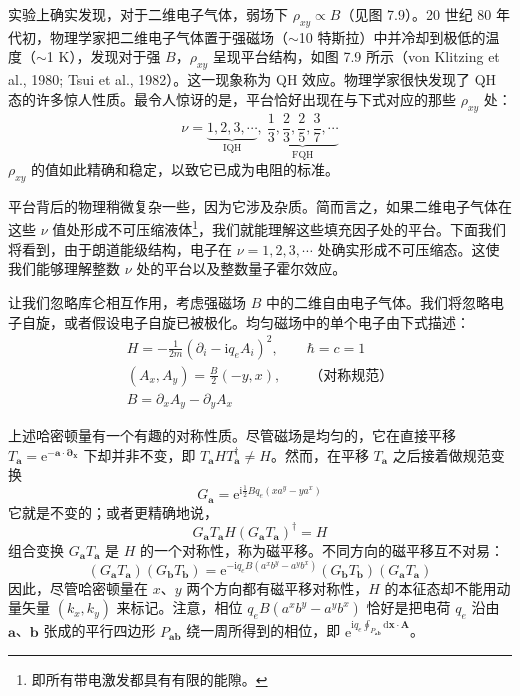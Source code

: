 实验上确实发现，对于二维电子气体，弱场下 $\rho_{xy}\propto B$（见图 7.9）。20 世纪 80 年代初，物理学家把二维电子气体置于强磁场（$\sim$10 特斯拉）中并冷却到极低的温度（$\sim$1 K），发现对于强 $B$，$\rho_{xy}$ 呈现平台结构，如图 7.9 所示（von Klitzing et al., 1980; Tsui et al., 1982）。这一现象称为 QH 效应。物理学家很快发现了 QH 态的许多惊人性质。最令人惊讶的是，平台恰好出现在与下式对应的那些 $\rho_{xy}$ 处：
\begin{equation*}
\nu = \underbrace{1, 2, 3, \cdots}_{\text{IQH}},\ \underbrace{\frac{1}{3}, \frac{2}{3}, \frac{2}{5}, \frac{3}{7}, \cdots}_{\text{FQH}}
\end{equation*}
$\rho_{xy}$ 的值如此精确和稳定，以致它已成为电阻的标准。

平台背后的物理稍微复杂一些，因为它涉及杂质。简而言之，如果二维电子气体在这些 $\nu$ 值处形成不可压缩液体\footnote{即所有带电激发都具有有限的能隙。}，我们就能理解这些填充因子处的平台。下面我们将看到，由于朗道能级结构，电子在 $\nu=1,2,3,\cdots$ 处确实形成不可压缩态。这使我们能够理解整数 $\nu$ 处的平台以及整数量子霍尔效应。

让我们忽略库仑相互作用，考虑强磁场 $B$ 中的二维自由电子气体。我们将忽略电子自旋，或者假设电子自旋已被极化。均匀磁场中的单个电子由下式描述：
\begin{gather*}
H = -\frac{1}{2m}(\partial_i-\mathrm{i}q_eA_i)^2, \qquad \hbar = c = 1 \tag{7.2.1}\\
(A_x, A_y) = \frac{B}{2}(-y, x), \qquad \text{（对称规范）}\\
B = \partial_xA_y - \partial_yA_x
\end{gather*}

上述哈密顿量有一个有趣的对称性质。尽管磁场是均匀的，它在直接平移 $T_{\pmb{a}}=\mathrm{e}^{-\pmb{a}\cdot\pmb{\partial}_{\pmb{x}}}$ 下却并非不变，即 $T_{\pmb{a}}HT_{\pmb{a}}^{\dagger}\neq H$。然而，在平移 $T_{\pmb{a}}$ 之后接着做规范变换
\begin{equation*}
G_{\pmb{a}} = \mathrm{e}^{\mathrm{i}\frac{1}{2}Bq_e(xa^y-ya^x)} \tag{7.2.2}
\end{equation*}
它就是不变的；或者更精确地说，
\begin{equation*}
G_{\pmb{a}}T_{\pmb{a}}H(G_{\pmb{a}}T_{\pmb{a}})^{\dagger} = H
\end{equation*}
组合变换 $G_{\pmb{a}}T_{\pmb{a}}$ 是 $H$ 的一个对称性，称为磁平移。不同方向的磁平移互不对易：
\begin{equation*}
(G_{\pmb{a}}T_{\pmb{a}})(G_{\pmb{b}}T_{\pmb{b}}) = \mathrm{e}^{-\mathrm{i}q_eB(a^xb^y-a^yb^x)}(G_{\pmb{b}}T_{\pmb{b}})(G_{\pmb{a}}T_{\pmb{a}}) \tag{7.2.3}
\end{equation*}
因此，尽管哈密顿量在 $x$、$y$ 两个方向都有磁平移对称性，$H$ 的本征态却不能用动量矢量 $(k_x,k_y)$ 来标记。注意，相位 $q_eB(a^xb^y-a^yb^x)$ 恰好是把电荷 $q_e$ 沿由 $\pmb{a}$、$\pmb{b}$ 张成的平行四边形 $P_{\pmb{a}\pmb{b}}$ 绕一周所得到的相位，即 $\mathrm{e}^{\mathrm{i}q_e\oint_{P_{\pmb{ab}}}\mathrm{d}\pmb{x}\cdot\pmb{A}}$。


